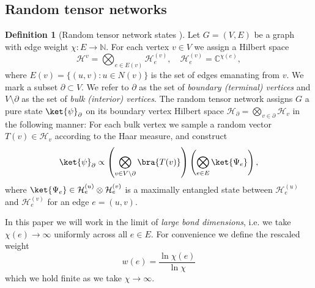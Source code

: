 \documentclass[11pt,oneside,letterpaper]{article}
\numberwithin{equation}{section}
\theoremstyle{definition}
\newtheorem{definition}[theorem]{Definition}
\theoremstyle{remark}
\begin{document}
\subsection{Random tensor networks}
\begin{definition}[Random tensor network states \cite{Hayden:2016cfa}]
  Let $G=(V,E)$ be a graph with edge weight $\chi:E\to \mathbb{N}$. For each vertex $v\in V$ we assign a Hilbert space
  \begin{equation}
    \mathcal{H}^v = \bigotimes_{e\in E(v)} \mathcal{H}^{(v)}_e,\quad \mathcal{H}^{(v)}_e = \mathbb{C}^{\chi(e)},
  \end{equation}
  where $E(v)=\{(u,v):u\in N(v)\}$ is the set of edges emanating from $v$.
  We mark a subset $\partial\subset V$. We refer to $\partial$ as the set of \emph{boundary (terminal) vertices} and $V\setminus\partial$ as the set of \emph{bulk (interior) vertices}.
  The random tensor network assigns $G$ a pure state $\ket{\psi}_\partial$ on its boundary vertex Hilbert space $\mathcal{H}_\partial=\bigotimes_{\mathit{v}\in \partial} \mathcal{H}_v$ in the following manner: For each bulk vertex we sample a random vector $T(v)\in \mathcal{H}_v$ according to the Haar measure, and construct
  \begin{equation}
    \ket{\psi}_\partial \propto \left(\bigotimes_{v\in V\setminus \partial} \bra{T(v)} \right) \left(\bigotimes_{e\in E} \ket{\Psi_e}\right),
  \end{equation}
  where $\ket{\Psi_e}\in \mathcal{H}^{(u)}_e\otimes \mathcal{H}^{(v)}_e$ is a maximally entangled state between $\mathcal{H}^{(u)}_e$ and $\mathcal{H}^{(v)}_e$ for an edge $e=(u,v)$.
\end{definition}
In this paper we will work in the limit of \emph{large bond dimensions}, i.e. we take $\chi(e)\to \infty$ uniformly across all $e\in E$. For convenience we define the rescaled weight
\begin{equation}
  w(e) = \frac{\ln \chi(e)}{\ln \chi}
\end{equation}
which we hold finite as we take $\chi\to \infty$.
\end{document}
